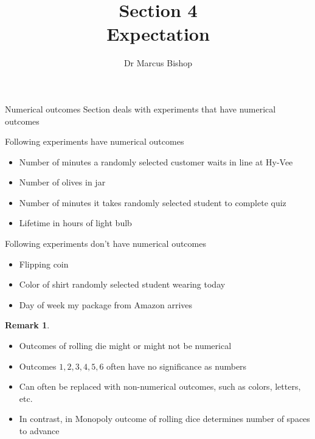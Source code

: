 \documentclass[handout]{beamer}
\title[\S4]{Section 4\\Expectation}
\author{Dr Marcus Bishop}
\theoremstyle{definition}
\newtheorem{remark}{Remark}
\begin{document}
\begin{frame}\titlepage\end{frame}
\LogoOff

\begin{frame}{Numerical outcomes}
Section deals with experiments
that have \alert{numerical outcomes}
\begin{example}
Following experiments have numerical outcomes
\begin{itemize}
\item Number of minutes a randomly selected
customer waits in line at Hy-Vee
\item Number of olives in jar
\item Number of minutes it takes randomly selected
student to complete quiz
\item Lifetime in hours of light bulb
\end{itemize}
\end{example}
\end{frame}

\begin{frame}
\begin{example}
Following experiments \alert{don't} have numerical outcomes
\begin{itemize}
\item Flipping coin
\item Color of shirt randomly selected student wearing today
\item Day of week my package from Amazon arrives
\end{itemize}
\end{example}
\begin{remark}
\begin{itemize}
\item Outcomes of rolling die might or might not be numerical
\item Outcomes $1,2,3,4,5,6$  often have no significance as numbers
\item Can often be replaced with non-numerical outcomes,
such as colors, letters, etc.
\item In contrast, in Monopoly outcome of rolling dice
determines \alert{number} of spaces to advance
\end{itemize}
\end{remark}
\end{frame}
\end{document}
